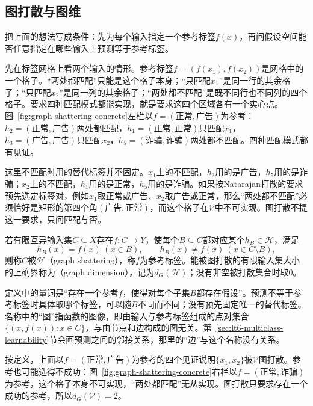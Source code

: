 \subsection{图打散与图维}
\label{sec:comb-reference-labels}
\label{sec:lt6-graph-dimension}

把上面的想法写成条件：先为每个输入指定一个参考标签$f(x)$，再问假设空间能否任意指定在哪些输入上预测等于参考标签。

先在标签网格上看两个输入的情形。参考标签$f=(f(x_1),f(x_2))$是网格中的一个格子。“两处都匹配”只能是这个格子本身；“只匹配$x_1$”是同一行的其余格子；“只匹配$x_2$”是同一列的其余格子；“两处都不匹配”是既不同行也不同列的四个格子。要求四种匹配模式都能实现，就是要求这四个区域各有一个实心点。图~\ref{fig:graph-shattering-concrete}左栏以$f=(\text{正常},\text{广告})$为参考：$h_2=(\text{正常},\text{广告})$两处都匹配，$h_1=(\text{正常},\text{正常})$只匹配$x_1$，$h_3=(\text{广告},\text{广告})$只匹配$x_2$，$h_5=(\text{诈骗},\text{诈骗})$两处都不匹配。四种匹配模式都有见证。

这里不匹配时用的替代标签并不固定。$x_1$上的不匹配，$h_3$用的是广告，$h_5$用的是诈骗；$x_2$上的不匹配，$h_1$用的是正常，$h_5$用的是诈骗。如果按Natarajan打散的要求预先选定标签对，例如$x_1$取正常或广告、$x_2$取广告或正常，那么“两处都不匹配”必须恰好是矩形的第四个角$(\text{广告},\text{正常})$，而这个格子在$\mathcal V$中不可实现。图打散不提这一要求，只问匹配与否。

\begin{definition}[图打散与图维]
\label{def:graph-dimension}
\label{def:graph-dimension-value}
若有限互异输入集$C\subseteq X$存在$f:C\to Y$，使每个$B\subseteq C$都对应某个$h_B\in\mathcal H$，满足
\[
 h_B(x)=f(x)\ (x\in B),\qquad h_B(x)\neq f(x)\ (x\in C\setminus B),
\]
则称$C$被$\mathcal H$（graph shattering），称$f$为参考标签。能被图打散的有限输入集大小的上确界称为（graph dimension），记为$d_G(\mathcal H)$；没有非空被打散集合时取$0$。
\end{definition}

定义中的量词是“存在一个参考$f$，使得对每个子集$B$都存在假设”。预测不等于参考标签时具体取哪个标签，可以随$B$不同而不同；没有预先固定唯一的替代标签。名称中的“图”指函数的图像，即由输入与参考标签组成的点对集合$\{(x,f(x)):x\in C\}$，与由节点和边构成的图无关。第~\ref{sec:lt6-multiclass-learnability}节会画预测之间的邻接关系，那里的“边”与这个名称没有关系。

按定义，上面以$f=(\text{正常},\text{广告})$为参考的四个见证说明$\{x_1,x_2\}$被$\mathcal V$图打散。参考也可能选得不成功：图~\ref{fig:graph-shattering-concrete}右栏以$f=(\text{正常},\text{诈骗})$为参考，这个格子本身不可实现，“两处都匹配”无从实现。图打散只要求存在一个成功的参考，所以$d_G(\mathcal V)=2$。

